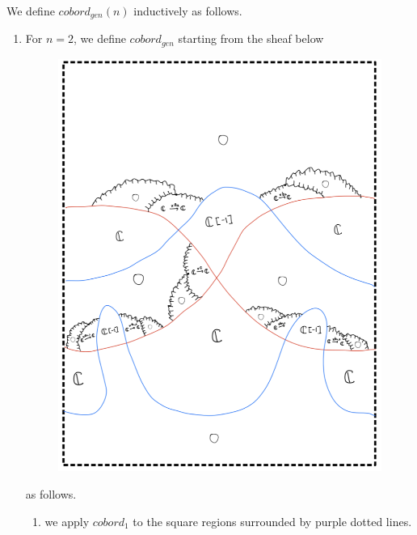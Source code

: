 We define $cobord_{gen}(n)$ inductively as follows.
\begin{enumerate}[label = (\roman*)]
\item For $n=2$, we define $cobord_{gen}$ starting from the sheaf below
\begin{figure}[H]
    \centering
    \includegraphics[scale = 0.95]{diagrams/cobord_gen/base_1.png}
    \caption{}
    \label{fig:your-label}
\end{figure}
as follows.
\begin{enumerate}[label = (Step \arabic*)]
\item we apply $cobord_1$ to the square regions surrounded by purple dotted lines.
\begin{figure}[H]
    \centering

\end{figure}
\end{enumerate}
\end{enumerate}
